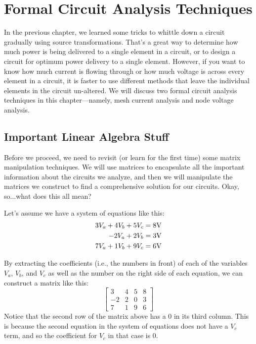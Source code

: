 \chapter{Formal Circuit Analysis Techniques}
\label{chap:formalAnalysis}
In the previous chapter, we learned some tricks to whittle down a circuit gradually using source transformations. That's a great way to determine how much power is being delivered to a single element in a circuit, or to design a circuit for optimum power delivery to a single element. However, if you want to know how much current is flowing through or how much voltage is across every element in a circuit, it is faster to use different methods that leave the individual elements in the circuit un-altered. We will discuss two formal circuit analysis techniques in this chapter---namely, mesh current analysis and node voltage analysis.
\section{Important Linear Algebra Stuff}
Before we proceed, we need to revisit (or learn for the first time) some matrix manipulation techniques. We will use matrices to encapsulate all the important information about the circuits we analyze, and then we will manipulate the matrices we construct to find a comprehensive solution for our circuits. Okay, so...what does this all mean?
%
%

\par
Let's assume we have a system of equations like this:
\begin{align*}
3V_a + 4V_b + 5V_c &= 8\textnormal{V} \\
-2V_a + 2V_b &= 3\textnormal{V} \\
7V_a + 1V_b + 9V_c &= 6\textnormal{V}
\end{align*}

By extracting the coefficients (i.e., the numbers in front) of each of the variables $V_a$, $V_b$, and $V_c$ as well as the number on the right side of each equation, we can construct a matrix like this:
$$
\begin{bmatrix}
    3   & 4 & 5 & 8 \\
    -2  & 2 & 0 & 3 \\
    7   & 1 & 9 & 6
\end{bmatrix} 
$$
Notice that the second row of the matrix above has a 0 in its third column. This is because the second equation in the system of equations does not have a $V_c$ term, and so the coefficient for $V_c$ in that case is 0.
